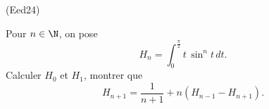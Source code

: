 \begin{tiny}(Eed24)\end{tiny}  Pour $n\in \N$, on pose
\[
  H_n = \int_0^{\frac{\pi}{2}}t\, \sin^nt \, dt.
\]
Calculer $H_0$ et $H_1$, montrer que
\[
  H_{n+1} = \frac{1}{n+1} + n\left(H_{n-1} - H_{n+1}\right).
\]
